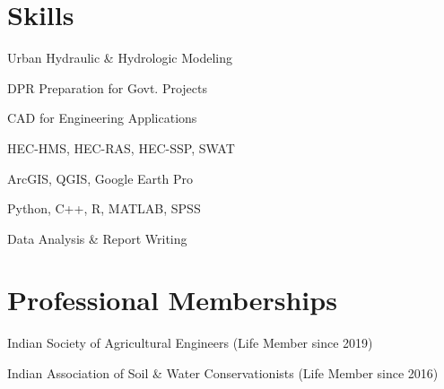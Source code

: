 \documentclass[]{deedy-resume-openfont}
\begin{document}
\begin{minipage}[t]{0.30\textwidth}

\section{Skills}
\begin{tightemize}
\item Urban Hydraulic \& Hydrologic Modeling
\item DPR Preparation for Govt. Projects
\item CAD for Engineering Applications
\item HEC-HMS, HEC-RAS, HEC-SSP, SWAT
\item ArcGIS, QGIS, Google Earth Pro
\item Python, C++, R, MATLAB, SPSS
\item Data Analysis \& Report Writing
\end{tightemize}
\sectionsep


\section{Professional Memberships}
\begin{tightemize}
\item Indian Society of Agricultural Engineers (Life Member since 2019)
\item Indian Association of Soil \& Water Conservationists (Life Member since 2016)
\end{tightemize}
\sectionsep

\end{minipage}
\hfill
\end{document}
